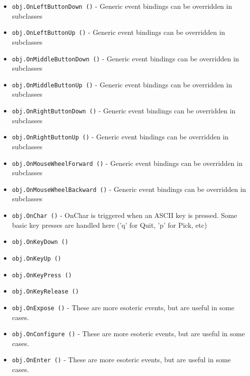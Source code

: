 \begin{itemize}
\item  \verb|obj.OnLeftButtonDown ()| -  Generic event bindings can be overridden in subclasses

\item  \verb|obj.OnLeftButtonUp ()| -  Generic event bindings can be overridden in subclasses

\item  \verb|obj.OnMiddleButtonDown ()| -  Generic event bindings can be overridden in subclasses

\item  \verb|obj.OnMiddleButtonUp ()| -  Generic event bindings can be overridden in subclasses

\item  \verb|obj.OnRightButtonDown ()| -  Generic event bindings can be overridden in subclasses

\item  \verb|obj.OnRightButtonUp ()| -  Generic event bindings can be overridden in subclasses

\item  \verb|obj.OnMouseWheelForward ()| -  Generic event bindings can be overridden in subclasses

\item  \verb|obj.OnMouseWheelBackward ()| -  Generic event bindings can be overridden in subclasses

\item  \verb|obj.OnChar ()| -  OnChar is triggered when an ASCII key is pressed. Some basic key presses
 are handled here ('q' for Quit, 'p' for Pick, etc)

\item  \verb|obj.OnKeyDown ()|

\item  \verb|obj.OnKeyUp ()|

\item  \verb|obj.OnKeyPress ()|

\item  \verb|obj.OnKeyRelease ()|

\item  \verb|obj.OnExpose ()| -  These are more esoteric events, but are useful in some cases.

\item  \verb|obj.OnConfigure ()| -  These are more esoteric events, but are useful in some cases.

\item  \verb|obj.OnEnter ()| -  These are more esoteric events, but are useful in some cases.


\end{itemize}
